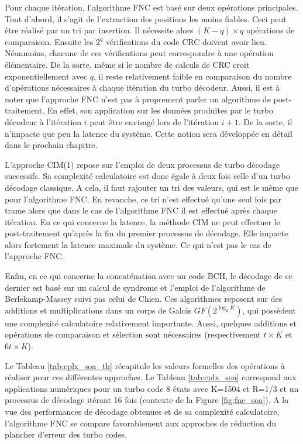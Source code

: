 Pour chaque itération, l'algorithme FNC est basé sur deux opérations principales. Tout d'abord, il s'agit de l'extraction 
des positions les moins fiables. Ceci peut être réalisé par un tri par insertion. Il nécessite alors $(K-q)\times q$ 
opérations de comparaison. Ensuite les $2^q$ vérifications du code CRC doivent avoir lieu. 
Néanmoins, chacune de ces vérifications peut correspondre à une opération élémentaire.
De la sorte, même si le 
nombre de calculs de CRC croit exponentiellement avec $q$, il reste relativement faible en comparaison du nombre 
d'opérations nécessaires à chaque itération du turbo décodeur. 
Aussi, il est à noter que l'approche FNC n'est pas à proprement parler un algorithme 
de post-traitement. En effet, son application sur les données produites par le turbo décodeur à l'itération $i$ peut être 
envisagé lors de l'itération $i+1$.  De la sorte, il n'impacte que peu la latence du système. Cette notion sera développée 
en détail dans le prochain chapitre.

L'approche CIM(1) repose sur l'emploi de deux processus de turbo décodage successifs. Sa complexité calculatoire est donc
égale à deux fois celle d'un turbo décodage classique. A cela, il faut rajouter un tri des valeurs, qui est 
le même que pour l'algorithme FNC. En revanche, ce tri n'est effectué qu'une seul fois par trame alors que dans le cas de l'algorithme
FNC il est effectué après chaque itération. En ce qui concerne la latence, la méthode CIM ne 
peut effectuer le post-traitement qu'après la fin du premier processus de décodage. Elle impacte alors fortement la latence
maximale du système. Ce qui n'est pas le cas de l'approche FNC.

Enfin, en ce qui concerne la concaténation avec un code BCH, le décodage de ce dernier est basé sur un calcul 
de syndrome et  l'emploi de l'algorithme
de Berlekamp-Massey suivi pas celui de Chien. Ces algorithmes reposent sur des additions et multiplications dans un corps
de Galois $GF(2^{\log_2 K})$, qui possèdent une complexité calculatoire relativement importante. Aussi, quelques additions
et opérations de comparaison et sélection sont nécessaires (respectivement $t\times K$ et $6t\times K$). 

Le Tableau \ref{tab:cplx_soa_th} récapitule les valeurs formelles des opérations à réaliser pour ces différentes approches.
Le Tableau \ref{tab:cplx_soa} correspond aux applications numériques pour un turbo code 8 états avec K=1504 et 
R=1/3 et un processus de décodage itérant 16 fois (contexte de la Figure \ref{fig:fnc_soa}). A la vue des performances de 
décodage obtenues et de sa complexité calculatoire, l'algorithme FNC se compare favorablement aux approches de réduction
du plancher d'erreur des turbo codes.

